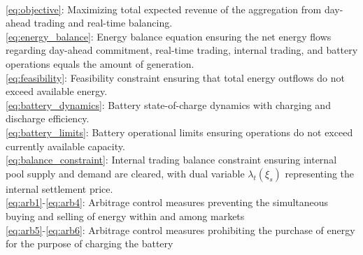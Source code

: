 \documentclass[10pt]{article}
\begin{document}
\\\noindent
\eqref{eq:objective}: Maximizing total expected revenue of the aggregation from day-ahead trading and real-time balancing. \\
\eqref{eq:energy_balance}: Energy balance equation ensuring the net energy flows regarding day-ahead commitment, real-time trading, internal trading, and battery operations equals the amount of generation.\\
\eqref{eq:feasibility}: Feasibility constraint ensuring that total energy outflows do not exceed available energy.\\
\eqref{eq:battery_dynamics}: Battery state-of-charge dynamics with charging and discharge efficiency.\\
\eqref{eq:battery_limits}: Battery operational limits ensuring operations do not exceed currently available capacity.\\
\eqref{eq:balance_constraint}: Internal trading balance constraint ensuring internal pool supply and demand are cleared, with dual variable $\lambda_t(\xi_s)$ representing the internal settlement price.\\
\eqref{eq:arb1}-\eqref{eq:arb4}: Arbitrage control measures preventing the simultaneous buying and selling of energy within and among markets\\
\eqref{eq:arb5}-\eqref{eq:arb6}: Arbitrage control measures prohibiting the purchase of energy for the purpose of charging the battery\\
\end{document}
